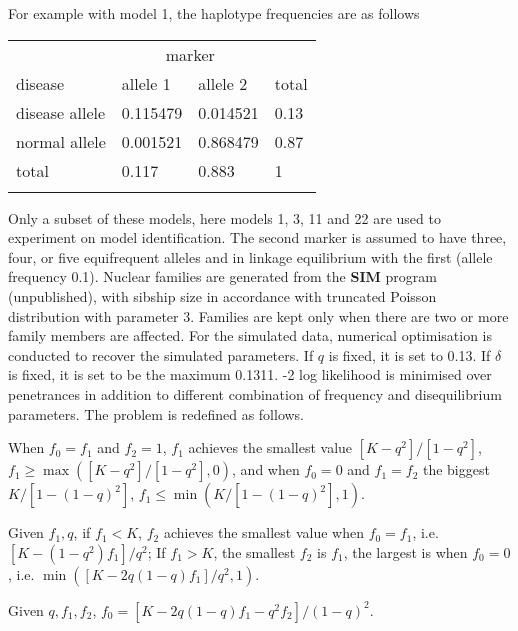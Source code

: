 \documentclass[11pt]{article}
\begin{document}
For example with model 1, the haplotype frequencies are as follows \medskip

\begin{tabular}{llll}
\\
                &  \multicolumn{2}{c}{marker}\\ %
disease         &   allele 1 & allele 2 & total\\
disease allele  & 0.115479 &  0.014521 &   0.13\\
normal  allele  & 0.001521 &  0.868479 &   0.87\\
total           & 0.117    &  0.883    &   1\\
\\
\end{tabular}
\medskip

Only a subset of these models, here models 1, 3, 11 and 22 are used to
experiment on model identification.  The second marker is assumed to have
three, four, or five equifrequent alleles and in linkage equilibrium with the
first (allele frequency 0.1).  Nuclear families are generated from the {\bf
SIM} program (unpublished), with sibship size in accordance with truncated
Poisson distribution with parameter 3.  Families are kept only when there are
two or more family members are affected.  For the simulated data, numerical
optimisation is conducted to recover the simulated parameters.  If $q$ is
fixed, it is set to 0.13.  If $\delta$ is fixed, it is set to be the maximum
0.1311.  -2 log likelihood is minimised over penetrances in addition to
different combination of frequency and disequilibrium parameters.  The problem
is redefined as follows.

When $f_0=f_1$ and $f_2=1$, $f_1$ achieves the smallest value
${[K-q^2]}/{[1-q^2]}$, $f_1\ge \max({[K-q^2]}/{[1-q^2]},0)$, and when $f_0=0$
and $f_1=f_2$ the biggest ${K}/{[1-(1-q)^2]}$,
$f_1\le\min({K}/{[1-(1-q)^2]},1)$.

Given $f_1,q$, if $f_1<K$, $f_2$ achieves the smallest value when $f_0=f_1$,
i.e. ${[K-(1-q^2)f_1]}/{q^2}$; If $f_1>K$, the smallest $f_2$ is $f_1$, the
largest is when $f_0=0$, i.e.  $\min({[K-2q(1-q)f_1]}/{q^2},1)$.

Given $q, f_1, f_2$, $f_0={[K-2q(1-q)f_1-q^2f_2]}/{(1-q)^2}$.
\end{document}
